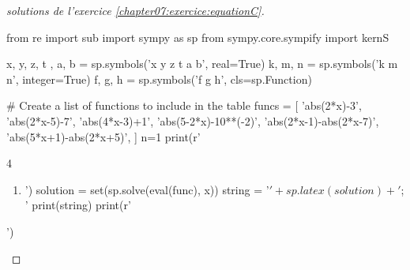 \begin{proof}[solutions de l'exercice \ref{chapter07:exercice:equationC}]\hfill  
\begin{pycode}
from re import sub
import sympy as sp
from sympy.core.sympify import kernS

x, y, z, t , a, b = sp.symbols('x y z t a b', real=True)
k, m, n = sp.symbols('k m n', integer=True)
f, g, h = sp.symbols('f g h', cls=sp.Function)

# Create a list of functions to include in the table
funcs = [
'abs(2*x)-3',
'abs(2*x-5)-7',
'abs(4*x-3)+1',
'abs(5-2*x)-10**(-2)',
'abs(2*x-1)-abs(2*x-7)',
'abs(5*x+1)-abs(2*x+5)',
]
n=1
print(r'\begin{multicols}{4} \begin{enumerate}[label={$S_{\arabic*}=$}] ')
for func in funcs:
	print('\item ')
	solution = set(sp.solve(eval(func), x))
	string =  '$'+   sp.latex(solution ) + '$; '
	print(string)
print(r'\end{enumerate} \end{multicols} ')
\end{pycode}
\end{proof}

